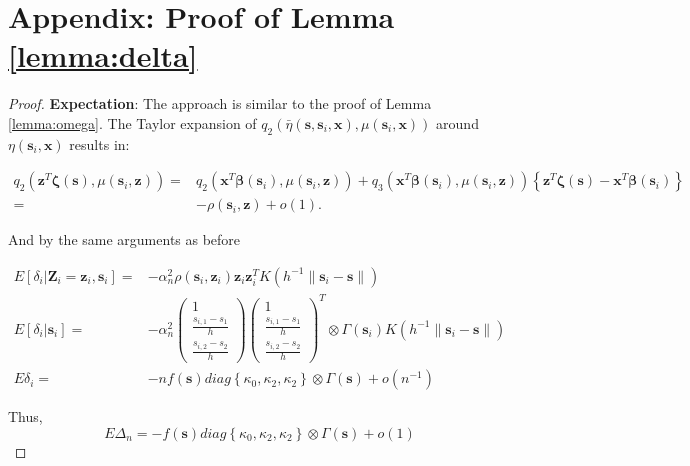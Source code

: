 \documentclass[authoryear,review, 12pt]{elsarticle}
\begin{document}
\section*{Appendix: Proof of Lemma \ref{lemma:delta}}
\begin{proof}
\textbf{Expectation}: The approach is similar to the proof of Lemma
\ref{lemma:omega}. The Taylor expansion of $q_{2}\left(\bar{\eta}\left(\bm{s},\bm{s}_{i},\bm{x}\right),\mu\left(\bm{s}_{i},\bm{x}\right)\right)$
around $\eta\left(\bm{s}_{i},\bm{x}\right)$ results in:

\begin{align*}
q_{2}\left(\bm{z}^{T}\bm{\zeta}\left(\bm{s}\right),\mu\left(\bm{s}_{i},\bm{z}\right)\right)= & q_{2}\left(\bm{x}^{T}\bm{\beta}\left(\bm{s}_{i}\right),\mu\left(\bm{s}_{i},\bm{z}\right)\right)+q_{3}\left(\bm{x}^{T}\bm{\beta}\left(\bm{s}_{i}\right),\mu\left(\bm{s}_{i},\bm{z}\right)\right)\left\{ \bm{z}^{T}\bm{\zeta}\left(\bm{s}\right)-\bm{x}^{T}\bm{\beta}\left(\bm{s}_{i}\right)\right\} \\
= & -\rho\left(\bm{s}_{i},\bm{z}\right)+o\left(1\right).
\end{align*}


And by the same arguments as before

\begin{align*}
E\left[\delta_{i}|\bm{Z}_{i}=\bm{z}_{i},\bm{s}_{i}\right]= & -\alpha_{n}^{2}\rho\left(\bm{s}_{i},\bm{z}_{i}\right)\bm{z}_{i}\bm{z}_{i}^{T}K\left(h^{-1}\|\bm{s}_{i}-\bm{s}\|\right)\\
E\left[\delta_{i}|\bm{s}_{i}\right]= & -\alpha_{n}^{2}\left(\begin{array}{c}
1\\
\frac{s_{i,1}-s_{1}}{h}\\
\frac{s_{i,2}-s_{2}}{h}
\end{array}\right)\left(\begin{array}{c}
1\\
\frac{s_{i,1}-s_{1}}{h}\\
\frac{s_{i,2}-s_{2}}{h}
\end{array}\right)^{T}\otimes\Gamma\left(\bm{s}_{i}\right)K\left(h^{-1}\|\bm{s}_{i}-\bm{s}\|\right)\\
E\delta_{i}= & -nf\left(\bm{s}\right)diag\left\{ \kappa_{0},\kappa_{2},\kappa_{2}\right\} \otimes\Gamma\left(\bm{s}\right)+o\left(n^{-1}\right)
\end{align*}


Thus, 
\[
E\Delta_{n}=-f\left(\bm{s}\right)diag\left\{ \kappa_{0},\kappa_{2},\kappa_{2}\right\} \otimes\Gamma\left(\bm{s}\right)+o\left(1\right)
\]



\end{proof}
\end{document}
